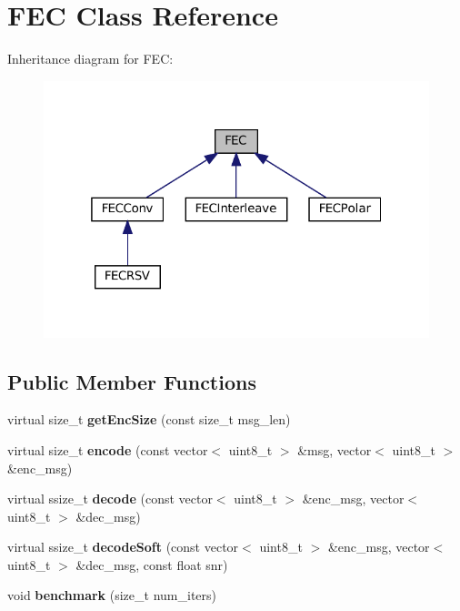 \hypertarget{classFEC}{}\section{F\+EC Class Reference}
\label{classFEC}


Inheritance diagram for F\+EC\+:
\nopagebreak
\begin{figure}[H]
\begin{center}
\leavevmode
\includegraphics[width=319pt]{classFEC__inherit__graph}
\end{center}
\end{figure}
\subsection*{Public Member Functions}
\begin{DoxyCompactItemize}
\item 
\mbox{\label{classFEC_a6504a5f7d5e1344538c25ed5481d0adb}} 
virtual size\+\_\+t {\bfseries get\+Enc\+Size} (const size\+\_\+t msg\+\_\+len)
\item 
\mbox{\label{classFEC_abc86f45390c50b3cd90cade73a137355}} 
virtual size\+\_\+t {\bfseries encode} (const vector$<$ uint8\+\_\+t $>$ \&msg, vector$<$ uint8\+\_\+t $>$ \&enc\+\_\+msg)
\item 
\mbox{\label{classFEC_aec87f2d9c2305283d226197bf76891cf}} 
virtual ssize\+\_\+t {\bfseries decode} (const vector$<$ uint8\+\_\+t $>$ \&enc\+\_\+msg, vector$<$ uint8\+\_\+t $>$ \&dec\+\_\+msg)
\item 
\mbox{\label{classFEC_a04ba63e1dac24bed00f448f9198e34b5}} 
virtual ssize\+\_\+t {\bfseries decode\+Soft} (const vector$<$ uint8\+\_\+t $>$ \&enc\+\_\+msg, vector$<$ uint8\+\_\+t $>$ \&dec\+\_\+msg, const float snr)
\item 
\mbox{\label{classFEC_aaccc10a6d38eb005f1f287119bdaecd8}} 
void {\bfseries benchmark} (size\+\_\+t num\+\_\+iters)
\end{DoxyCompactItemize}
